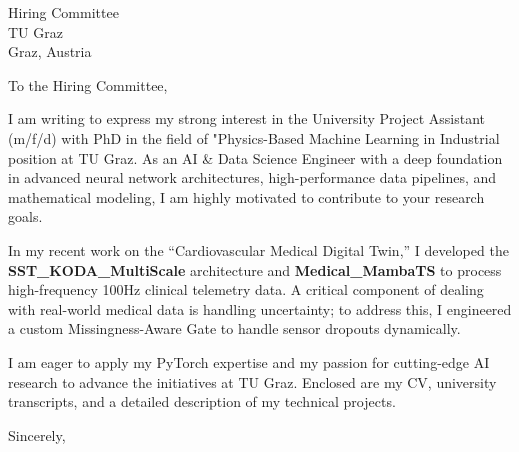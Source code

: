 \documentclass[11pt,a4paper]{letter}
\begin{document}
\begin{letter}{
    Hiring Committee \\
    TU Graz \\
    Graz, Austria
}
\opening{To the Hiring Committee,}

I am writing to express my strong interest in the University Project Assistant (m/f/d) with PhD in the field of "Physics-Based Machine Learning in Industrial position at TU Graz. As an AI \& Data Science Engineer with a deep foundation in advanced neural network architectures, high-performance data pipelines, and mathematical modeling, I am highly motivated to contribute to your research goals.

In my recent work on the ``Cardiovascular Medical Digital Twin,'' I developed the \textbf{SST\_KODA\_MultiScale} architecture and \textbf{Medical\_MambaTS} to process high-frequency 100Hz clinical telemetry data. A critical component of dealing with real-world medical data is handling uncertainty; to address this, I engineered a custom Missingness-Aware Gate to handle sensor dropouts dynamically. 

I am eager to apply my PyTorch expertise and my passion for cutting-edge AI research to advance the initiatives at TU Graz. Enclosed are my CV, university transcripts, and a detailed description of my technical projects.

\closing{Sincerely,}
\end{letter}
\end{document}

